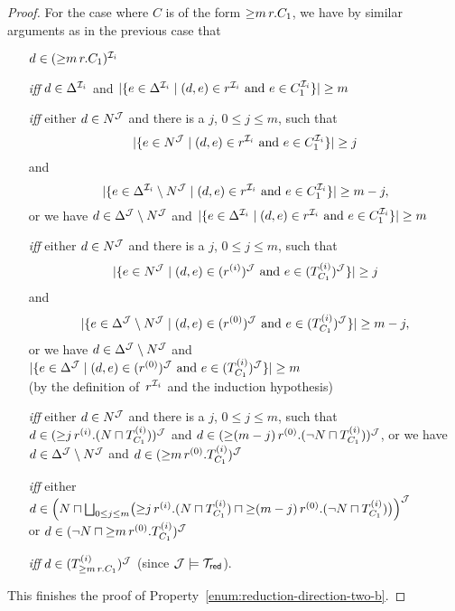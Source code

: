 \begin{proof}
    \noindent
    For the case where $C$ is of the form ${\ge}m\,r.C_1$, we have by
    similar arguments as in the previous case that
    \begin{itemize}
        \item[]
            $d\in({\ge}m\,r.C_1)^{\mathcal{I}_i}$
        \item[\emph{iff}]
            $d\in\Delta^{\mathcal{I}_i}$ and
            $\lvert\{e\in\Delta^{\mathcal{I}_i}\mid\text{$(d,e)\in r^{\mathcal{I}_i}$ and $e\in C_1^{\mathcal{I}_i}$}\}\rvert\ge m$
        \item[\emph{iff}]
            either $d\in N^\mathcal{J}$ and there is a $j$, $0\le j\le m$, such that
            \[\lvert\{e\in N^\mathcal{J}\mid\text{$(d,e)\in r^{\mathcal{I}_i}$ and $e\in C_1^{\mathcal{I}_i}$}\}\rvert\ge j\]
            and
            \[\lvert\{e\in\Delta^{\Imc_i}\setminus N^\Jmc\mid%
                \text{$(d,e)\in r^{\Imc_i}$ and $e\in C_1^{\Imc_i}$}\}\rvert\ge m-j,\]
            or we have
            $d\in\Delta^\mathcal{J}\setminus N^\mathcal{J}$ and
            $\lvert\{e\in\Delta^{\mathcal{I}_i}\mid\text{$(d,e)\in r^{\mathcal{I}_i}$ and $e\in C_1^{\mathcal{I}_i}$}\}\rvert\ge m$
        \item[\emph{iff}]
            either $d\in N^\mathcal{J}$ and there is a $j$, $0\le j\le m$, such that
            \[\lvert\{e\in N^\mathcal{J}\mid\text{$(d,e)\in(r^{(i)})^\mathcal{J}$ and $e\in(T_{C_1}^{(i)})^\mathcal{J}$}\}\rvert\ge j\]
            and
            \[\lvert\{e\in\Delta^\Jmc\setminus N^\Jmc\mid%
                \text{$(d,e)\in(r^{(0)})^\Jmc$ and $e\in(T_{C_1}^{(i)})^\Jmc$}\}\rvert\ge m-j,\]
            or we have
            $d\in\Delta^\mathcal{J}\setminus N^\mathcal{J}$ and
            $\lvert\{e\in\Delta^\mathcal{J}\mid\text{$(d,e)\in(r^{(0)})^\mathcal{J}$ and $e\in(T_{C_1}^{(i)})^\mathcal{J}$}\}\rvert\ge m$\\
            (by the definition of~$r^{\mathcal{I}_i}$ and the induction hypothesis)
        \item[\emph{iff}]
            either $d\in N^\mathcal{J}$ and there is a $j$, $0\le j\le m$, such that
            $d\in({\ge}j\,r^{(i)}.(N\sqcap T_{C_1}^{(i)}))^\mathcal{J}$ and
            $d\in({\ge}(m-j)\,r^{(0)}.(\lnot N\sqcap T_{C_1}^{(i)}))^\mathcal{J}$,
            or we have
            $d\in\Delta^\mathcal{J}\setminus N^\mathcal{J}$ and
            $d\in({\ge}m\,r^{(0)}.T_{C_1}^{(i)})^\mathcal{J}$
        \item[\emph{iff}]
            either
            $d\in\Bigl(N\sqcap\bigsqcup_{0\le j\le m}\bigl(%
                \atLeast{j}{r^{(i)}}{(N\sqcap T_{C_1}^{(i)})}\sqcap%
                \atLeast{(m-j)}{r^{(0)}}{(\lnot N\sqcap T_{C_1}^{(i)})}\bigr)\Bigr)^\Jmc$\\
            or
            $d\in(\lnot N\sqcap{\ge}m\,r^{(0)}.T_{C_1}^{(i)})^\mathcal{J}$
        \item[\emph{iff}]
            $d\in(T_{{\ge}m\,r.C_1}^{(i)})^\mathcal{J}$ (since $\mathcal{J}\models\mathcal{T}_\mathsf{red}$).
    \end{itemize}
    This finishes the proof of Property~\eqref{enum:reduction-direction-two-b}.


\end{proof}

